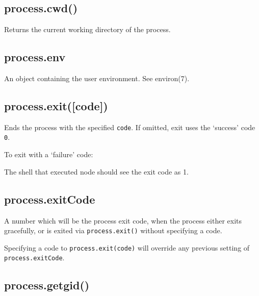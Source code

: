 \subsection{process.cwd()}

Returns the current working directory of the process.

\begin{Shaded}
\begin{Highlighting}[]
\NormalTok{(} \NormalTok{+ }\NormalTok{());}
\end{Highlighting}
\end{Shaded}

\subsection{process.env}

An object containing the user environment. See environ(7).

\subsection{process.exit({[}code{]})}

Ends the process with the specified \texttt{code}. If omitted, exit uses
the `success' code \texttt{0}.

To exit with a `failure' code:

\begin{Shaded}
\begin{Highlighting}[]
\NormalTok{(}\NormalTok{);}
\end{Highlighting}
\end{Shaded}

The shell that executed node should see the exit code as 1.

\subsection{process.exitCode}

A number which will be the process exit code, when the process either
exits gracefully, or is exited via \texttt{process.exit()} without
specifying a code.

Specifying a code to \texttt{process.exit(code)} will override any
previous setting of \texttt{process.exitCode}.

\subsection{process.getgid()}

